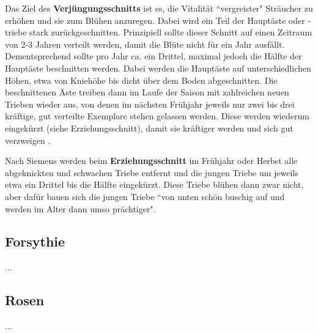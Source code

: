 Das Ziel des \textbf{Verjüngungsschnitts} ist es, die Vitalität ``vergreister" Sträucher zu erhöhen und sie zum Blühen anzuregen. 
Dabei wird ein Teil der Hauptäste oder -triebe stark zurückgeschnitten.
Prinzipiell sollte dieser Schnitt auf einen Zeitraum von 2-3 Jahren verteilt werden, damit die Blüte nicht für ein Jahr ausfällt.
Dementsprechend sollte pro Jahr ca. ein Drittel, maximal jedoch die Hälfte der Hauptäste beschnitten werden.
Dabei werden die Hauptäste auf unterschiedlichen Höhen, etwa von Kniehöhe bis dicht über dem Boden abgeschnitten.
Die beschnittenen Äste treiben dann im Laufe der Saison mit zahlreichen neuen Trieben wieder aus, von denen im nächsten Frühjahr jeweils nur zwei bis drei kräftige, gut verteilte Exemplare stehen gelassen werden.
Diese werden wiederum eingekürzt (siehe Erziehungsschnitt), damit sie kräftiger werden und sich gut verzweigen \cite{Siemens2021}. 

Nach Siemens \cite{Siemens2021} werden beim \textbf{Erziehungsschnitt} im Frühjahr oder Herbst alle abgeknickten und schwachen Triebe entfernt und die jungen Triebe um jeweils etwa ein Drittel bis die Hälfte eingekürzt.
Diese Triebe blühen dann zwar nicht, aber dafür bauen sich die jungen Triebe ``von unten schön buschig auf und werden im Alter dann umso prächtiger".

\subsection{Forsythie}

...

\subsection{Rosen}

...


\pagebreak